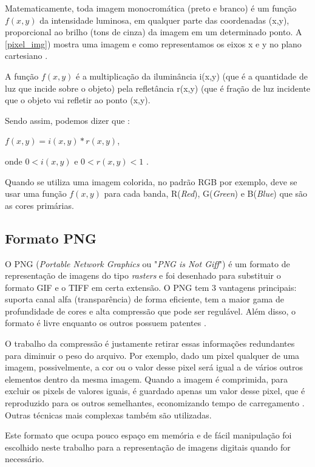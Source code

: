 Matematicamente, toda imagem monocromática (preto e branco) é um função $f(x,y)$ da intensidade luminosa, em qualquer parte das coordenadas (x,y), proporcional ao brilho (tons de cinza) da imagem em um determinado ponto. A \autoref{pixel_img}) mostra uma imagem e como representamos os eixos x e y no plano cartesiano \cite{gonzalez_woods}. 

A função  $f(x,y)$  é a multiplicação da iluminância  i(x,y) (que é a quantidade de luz que incide sobre o objeto) pela refletância  r(x,y)  (que é fração de luz incidente que o objeto vai refletir ao ponto (x,y). 

Sendo assim, podemos dizer que :

$f(x,y) = i(x,y) * r(x,y)$,

onde $0 < i(x,y)$ e $0 < r(x,y) < 1$ .

Quando se utiliza uma imagem colorida, no padrão RGB por exemplo,  deve se usar uma função $f(x,y)$ para cada banda, R(\textit{Red}), G(\textit{Green}) e B(\textit{Blue}) que são as cores primárias\cite{gonzalez_woods}.

 
\subsection{Formato PNG}\label{subsec:png}

O PNG (\textit{Portable Network Graphics} ou "\textit{PNG is Not Giff}") é um formato de representação de imagens do tipo \textit{rasters} e foi desenhado para substituir o formato GIF e o TIFF em certa extensão. O PNG tem 3 vantagens principais: suporta canal alfa (transparência) de forma eficiente, tem a maior gama de profundidade de cores e alta compressão que pode ser regulável. Além disso, o formato é livre enquanto os outros possuem patentes \cite{png}. 

O trabalho da compressão é justamente retirar essas informações redundantes para diminuir o peso do arquivo. Por exemplo, dado um pixel qualquer de uma imagem, possivelmente, a cor ou o valor desse pixel será igual a de vários outros elementos dentro da mesma imagem. Quando a imagem é comprimida, para excluir os pixels de valores iguais, é guardado apenas um valor desse pixel, que é reproduzido para os outros semelhantes, economizando tempo de carregamento \cite{img_compact}. Outras técnicas mais complexas também são utilizadas.

Este formato que ocupa pouco espaço em memória e de fácil manipulação foi escolhido neste trabalho para a representação de imagens digitais quando for necessário.


